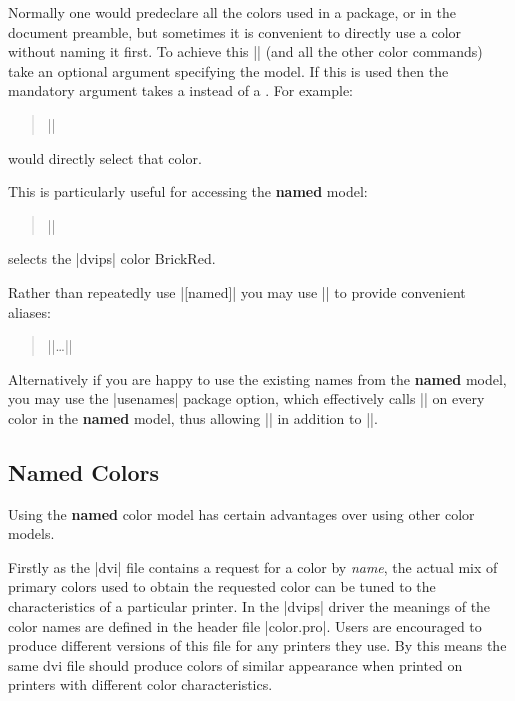 
Normally one would predeclare all the colors used in a package, or in
the document preamble, but sometimes it is convenient to directly use
a color without naming it first. To achieve this |\color| (and all
the other color commands) take an optional argument specifying the
model. If this is used then the mandatory argument takes a
 instead of a . For example:
\begin{quote}
  |\color[rgb]{1,0.2,0.3}|
\end{quote}
would directly select that color.

This is particularly useful for accessing the \textbf{named} model:
\begin{quote}
  |\color[named]{BrickRed}|
\end{quote}
selects the |dvips| color BrickRed.

Rather than repeatedly use |[named]| you may use |\definecolor| to
provide convenient aliases:
\begin{quote}
  ||\ldots |\color{myred}|\kern-10pt
\end{quote}
Alternatively if you are happy to use the existing names from the
\textbf{named} model, you may use the |usenames| package option, which
effectively calls |\definecolor| on every color in the \textbf{named}
model, thus allowing |\color{WildStrawberry}| in addition to
|\color[named]{WildStrawbery}|.

\subsection{Named Colors}
Using the \textbf{named} color model has certain advantages over
using other color models.

Firstly as the |dvi| file contains a request
for a color by \emph{name}, the actual mix of primary colors used to
obtain the requested color can be tuned to the characteristics of a
particular printer. In the |dvips| driver the meanings of the color
names are defined in the header file |color.pro|. Users are encouraged
to produce different versions of this file for any printers they use. By
this means the same dvi file should produce colors of similar
appearance when printed on printers with different color
characteristics.

